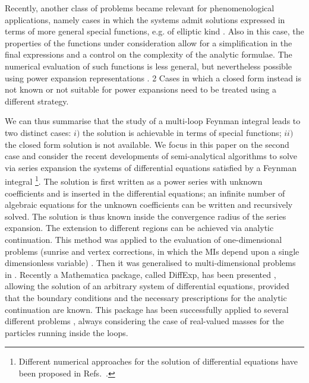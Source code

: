 \documentclass[final,1p,times]{elsarticle}
\begin{document}
Recently, another class of problems became relevant for phenomenological applications, namely cases in which the systems admit solutions expressed in terms of more general special functions, e.g. of elliptic kind \cite{Adams:2016xah,Remiddi:2017har,Broedel:2017kkb,Broedel:2017siw,Broedel:2018iwv,Ablinger:2017bjx,Bourjaily:2022bwx}. Also in this case, the properties of the functions under consideration allow for a simplification in the final expressions and a control on the complexity of the analytic formulae. The numerical evaluation of such functions is less general, but nevertheless possible using power expansion representations \cite{Walden:2020odh}. 2
%
Cases in which a closed form instead is not known or not suitable for power expansions need to be treated using a different strategy.

We can thus summarise that the study of a multi-loop 
Feynman integral leads to two distinct cases: $i)$ the solution is achievable in terms of special functions; $ii)$ the closed form solution is not available.
We focus in this paper on the second case and consider the recent developments of semi-analytical algorithms to solve via series expansion the systems of differential equations satisfied by a Feynman integral
\footnote{
Different numerical approaches for the solution of differential equations have been proposed in Refs.~\cite{Czakon:2008zk,Mandal:2018cdj}.
}.
The solution is first written as a power series with unknown coefficients and is inserted in the differential equations; an infinite number of algebraic equations for the unknown coefficients can be written and recursively solved. The solution is thus known inside the convergence radius of the series expansion. The extension to different regions can be achieved via analytic continuation.
 This method was applied to the evaluation of one-dimensional problems (sunrise and vertex corrections, in which the MIs depend upon a single dimensionless variable) \cite{Pozzorini:2005ff,Aglietti:2007as,Lee:2017qql,Lee:2018ojn,Bonciani:2018uvv,Fael:2021kyg,Fael:2022rgm}. Then it was generalised to multi-dimensional problems in \cite{Moriello:2019yhu}. Recently a {\sc Mathematica} package, called {\sc DiffExp}, has been presented \cite{Hidding:2020ytt}, allowing the solution of an arbitrary system of differential equations, provided that the boundary conditions and the necessary prescriptions for the analytic continuation are known. This package has been successfully applied to several different problems \cite{Bonciani:2019jyb,Frellesvig:2019byn,Abreu:2020jxa,Dubovyk:2022frj,Bonciani:2021zzf,Becchetti:2020wof,Becchetti:2021axs}, always considering the case of real-valued masses for the particles running inside the loops.
 
\end{document}

